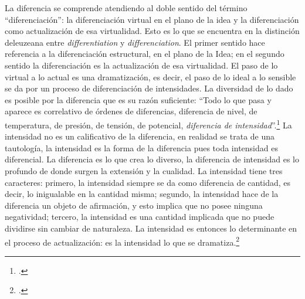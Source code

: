 La diferencia se comprende atendiendo al doble sentido del término \enquote{diferenciación}: la diferenciación virtual en el plano de la idea y la diferenciación como actualización de esa virtualidad. Esto es lo que se encuentra en la distinción deleuzeana entre \emph{differentiation} y \emph{differenciation}. El primer sentido hace referencia a la diferenciación estructural, en el plano de la Idea; en el segundo sentido la diferenciación es la actualización de esa virtualidad. El paso de lo virtual a lo actual es una dramatización, es decir, el paso de lo ideal a lo sensible se da por un proceso de diferenciación de intensidades. La diversidad de lo dado es posible por la diferencia que es su razón suficiente: \enquote{Todo lo que pasa y aparece es correlativo de órdenes de diferencias, diferencia de nivel, de temperatura, de presión, de tensión, de potencial, \emph{diferencia de intensidad}}.\footcite[333]{@6961-DELEUZE2002} La intensidad no es un calificativo de la diferencia, en realidad se trata de una tautología, la intensidad es la forma de la diferencia pues toda intensidad es diferencial. La diferencia es lo que crea lo diverso, la diferencia de intensidad es lo profundo de donde surgen la extensión y la cualidad. La intensidad tiene tres caracteres: primero, la intensidad siempre se da como diferencia de cantidad, es decir, lo inigualable en la cantidad misma; segundo, la intensidad hace de la diferencia un objeto de afirmación, y esto implica que no posee ninguna negatividad; tercero, la intensidad es una cantidad implicada que no puede dividirse sin cambiar de naturaleza. La intensidad es entonces lo determinante en el proceso de actualización: es la intensidad lo que se dramatiza.\footcite{@6975-DELEUZE2005}

